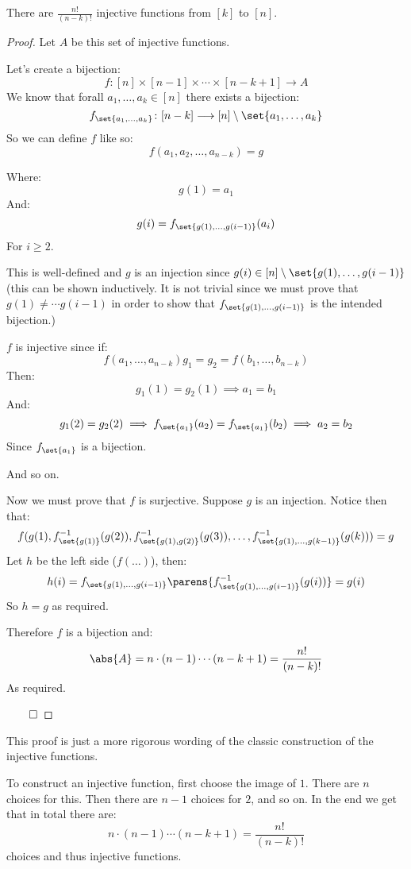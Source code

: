 \begin{prop*}

	There are $\frac{n!}{(n-k)!}$ injective functions from $[k]$ to $[n]$.

\end{prop*}

\begin{proof}

	Let $A$ be this set of injective functions.

	Let's create a bijection:
	\[ f\colon[n]\times[n-1]\times\cdots\times[n-k+1]\longrightarrow A \]
	We know that forall $a_1,\dots,a_k\in[n]$ there exists a bijection:
	\[ f_{\set{a_1,\dots,a_k}}\colon [n-k]\longrightarrow[n]\setminus\set{a_1,\dots,a_k} \]
	So we can define $f$ like so:
	\[ f(a_1,a_2,\dots,a_{n-k}) = g \]

	Where:
	\[ g(1) = a_1 \]
	And:
	\[ g(i) = f_{\set{g(1),\dots,g(i-1)}}(a_i) \]
	For $i\geq2$.

	This is well-defined and $g$ is an injection since $g(i)\in[n]\setminus\set{g(1),\dots,g(i-1)}$ (this can be shown
	inductively. It is not trivial since we must prove that $g(1)\neq\cdots g(i-1)$ in order to show that
	$f_{\set{g(1),\dots,g(i-1)}}$ is the intended bijection.)

	$f$ is injective since if:
	\[ f(a_1,\dots,a_{n-k}) g_1 = g_2 = f(b_1,\dots,b_{n-k}) \]
	Then:
	\[ g_1(1) = g_2(1) \implies a_1 = b_1 \]
	And:
	\[ g_1(2) = g_2(2) \implies f_{\set{a_1}}(a_2) = f_{\set{a_1}}(b_2) \implies a_2=b_2 \]
	Since $f_{\set{a_1}}$ is a bijection. 

	And so on.

	Now we must prove that $f$ is surjective. Suppose $g$ is an injection. Notice then that:
	\[ f(g(1), f^{-1}_{\set{g(1)}}(g(2)), f^{-1}_{\set{g(1),g(2)}}(g(3)), \dots, f^{-1}_{\set{g(1),\dots,g(k-1)}}(g(k))) = g \]
	Let $h$ be the left side ($f(\dots)$), then:
	\[ h(i) = f_{\set{g(1),\dots,g(i-1)}}\parens{f^{-1}_{\set{g(1),\dots,g(i-1)}}(g(i))} = g(i) \]
	So $h=g$ as required.
	
	Therefore $f$ is a bijection and:
	\[ \abs{A} = n\cdot(n-1)\cdots(n-k+1) = \frac{n!}{(n-k)!} \]
	As required.

	\hfill$\qed$

\end{proof}

\begin{note}

	This proof is just a more rigorous wording of the classic construction of the injective functions.

	To construct an injective function, first choose the image of $1$. There are $n$ choices for this. Then there are $n-1$
	choices for $2$, and so on. In the end we get that in total there are:
	\[ n\cdot(n-1)\cdots(n-k+1) = \frac{n!}{(n-k)!} \]
	choices and thus injective functions.

\end{note}

